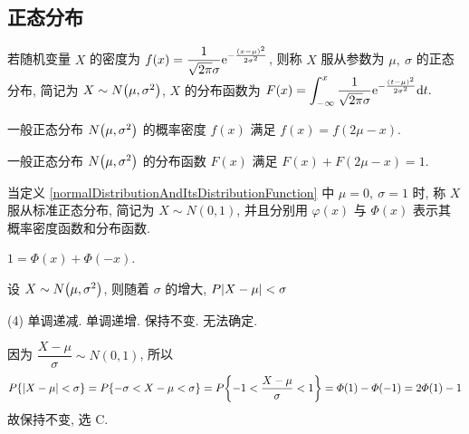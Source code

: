 \subsection{正态分布}

\begin{definition}[正态分布及其分布函数]
    \label{normalDistributionAndItsDistributionFunction}
    若随机变量 $X$ 的密度为 $f(x)=\dfrac{1}{\sqrt{2\pi}\sigma}\mathrm{e}^{-\frac{(x-\mu)^2}{2\sigma^2}}$, 则称 $X$ 服从参数为 $\mu,~\sigma$ 的正态分布, 简记为 $X\sim N\qty(\mu,\sigma^2)$, $X$ 的分布函数为 $\displaystyle F(x)=\int_{-\infty}^{x}\dfrac{1}{\sqrt{2\pi}\sigma}\mathrm{e}^{-\frac{(t-\mu)^2}{2\sigma^2}}\dd t.$
\end{definition}

\begin{theorem}[对称性]
    一般正态分布 $N\qty(\mu,\sigma^2)$ 的概率密度 $f(x)$ 满足 $f(x)=f(2\mu-x).$
\end{theorem}
\begin{theorem}[和一性]
    一般正态分布 $N\qty(\mu,\sigma^2)$ 的分布函数 $F(x)$ 满足 $F(x)+F(2\mu-x)=1.$
\end{theorem}

\begin{definition}[标准正态分布]
    当定义 \ref{normalDistributionAndItsDistributionFunction} 中 $\mu=0,~\sigma=1$ 时, 称 $X$ 服从标准正态分布, 简记为 $X\sim N(0,1)$, 并且分别用 $\varphi(x)$ 与 $\varPhi(x)$ 表示其概率密度函数和分布函数.
\end{definition}

\begin{theorem}[标准正态分布的分布函数和]
    $1=\varPhi(x)+\varPhi(-x)$.
\end{theorem}

\begin{example}
    设 $X \sim N\qty(\mu,\sigma^2)$, 则随着 $\sigma$ 的增大, $P\qty|X-\mu|<\sigma$
    \begin{tasks}(4)
        \task 单调递减.
        \task 单调递增.
        \task 保持不变.
        \task 无法确定.
    \end{tasks}
\end{example}
\begin{solution}
    因为 $\dfrac{X-\mu}{\sigma}\sim N(0,1)$, 所以
    $$
        P\qty{|X-\mu|<\sigma}=P\qty{-\sigma<X-\mu<\sigma}=P\qty{-1<\dfrac{X-\mu}{\sigma}<1}=\varPhi(1)-\varPhi(-1)=2\varPhi(1)-1
    $$
    故保持不变, 选 C.
\end{solution}

